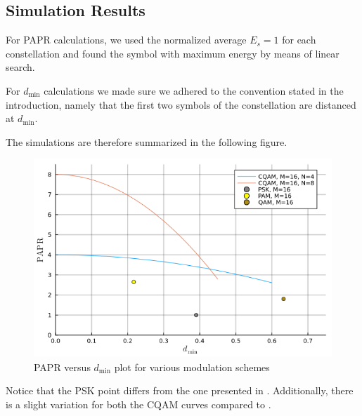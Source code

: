\documentclass[11pt,a4paper,onecolumn,final]{article}
\newcommand{\en}[1]{\foreignlanguage{english}{#1}}
\newcommand{\dmin}{d_\text{min}}
\begin{document}
\newpage
\subsection{Simulation Results}
For PAPR calculations, we used the normalized average \(E_s = 1\) for each constellation and found the symbol with maximum energy by means of linear search. 

For \(\dmin \) calculations we made sure we adhered to the convention stated in the introduction, namely that the first two symbols of the constellation are distanced at \(\dmin\). 

The simulations are therefore summarized in the following figure. 

\begin{figure}[h]
    \centering
    \includegraphics[scale=0.7]{ex1_sim.png}
    \caption{PAPR versus \(\dmin \) plot for various modulation schemes}
\end{figure}

Notice that the PSK point differs from the one presented in \cite{cqam}. Additionally, there is a slight variation for both the CQAM curves compared to \cite{cqam}. 




\en{}
\end{document}
